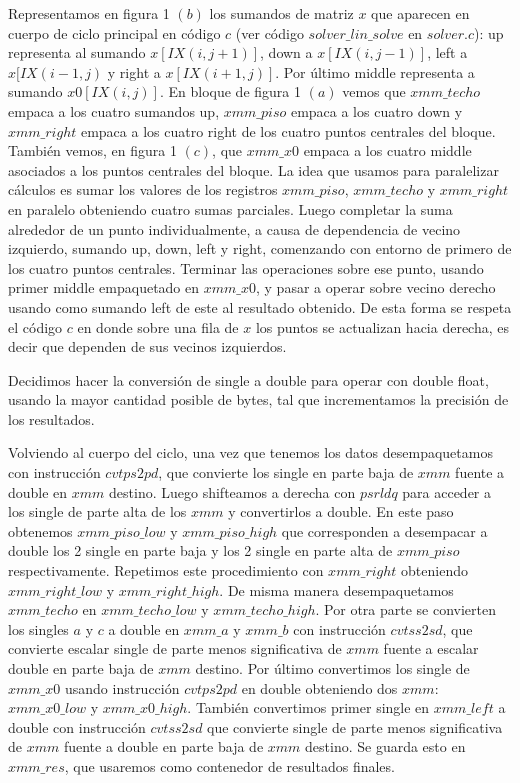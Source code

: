 \par Representamos en figura 1 $(b)$ los sumandos de matriz $x$ que aparecen en cuerpo de ciclo principal en código $c$ (ver código $solver\_lin\_solve$ en $solver.c$): up representa al sumando $x[IX(i,j+1)]$, down a $x[IX(i,j-1)]$, left a $x[IX(i-1,j)$ y right a $x[IX(i+1,j)]$. Por último middle representa a sumando $x0[IX(i,j)]$. En bloque de figura 1 $(a)$ vemos que $xmm\_techo$ empaca a los cuatro sumandos up, $xmm\_piso$ empaca a los cuatro down y $xmm\_right$ empaca a los cuatro right de los cuatro puntos centrales del bloque. También vemos, en figura 1 $(c)$, que $xmm\_x0$ empaca a los cuatro middle asociados a los puntos centrales del bloque. La idea que usamos para paralelizar cálculos es sumar los valores de los registros $xmm\_piso$, $xmm\_techo$ y $xmm\_right$ en paralelo obteniendo cuatro sumas parciales. Luego completar la suma alrededor de un punto individualmente, a causa de dependencia de vecino izquierdo, sumando up, down, left y right, comenzando con entorno de primero de los cuatro puntos centrales. Terminar las operaciones sobre ese punto, usando primer middle empaquetado en $xmm\_x0$, y pasar a operar sobre vecino derecho usando como sumando left de este al resultado obtenido. De esta forma se respeta el código $c$ en donde sobre una fila de $x$ los puntos se actualizan hacia derecha, es decir que dependen de sus vecinos izquierdos.\newline
\par Decidimos hacer la conversión de single a double para operar con double float, usando la mayor cantidad posible de bytes, tal que incrementamos la precisión de los resultados.
\par Volviendo al cuerpo del ciclo, una vez que tenemos los datos desempaquetamos con instrucción $cvtps2pd$, que convierte los single en parte baja de $xmm$ fuente a double en $xmm$ destino. Luego shifteamos a derecha con $psrldq$ para acceder a los single de parte alta de los $xmm$ y convertirlos a double.  En este paso obtenemos $xmm\_piso\_low$ y $xmm\_piso\_high$ que corresponden a desempacar a double los 2 single en parte baja y los 2 single en parte alta de $xmm\_piso$ respectivamente. Repetimos este procedimiento con $xmm\_right$ obteniendo $xmm\_right\_low$ y $xmm\_right\_high$. De misma manera desempaquetamos $xmm\_techo$ en $xmm\_techo\_low$ y $xmm\_techo\_high$. Por otra parte se convierten los singles $a$ y $c$ a double en $xmm\_a$ y $xmm\_b$ con instrucción $cvtss2sd$, que convierte escalar single de parte menos significativa de $xmm$ fuente a escalar double en parte baja de $xmm$ destino. Por último convertimos los single de $xmm\_x0$ usando instrucción $cvtps2pd$ en double obteniendo dos $xmm$: $xmm\_x0\_low$ y $xmm\_x0\_high$. También convertimos primer single en $xmm\_left$ a double con instrucción $cvtss2sd$ que convierte single de parte menos significativa de $xmm$ fuente a double en parte baja de $xmm$ destino. Se guarda esto en $xmm\_res$, que usaremos como contenedor de resultados finales.\newline

